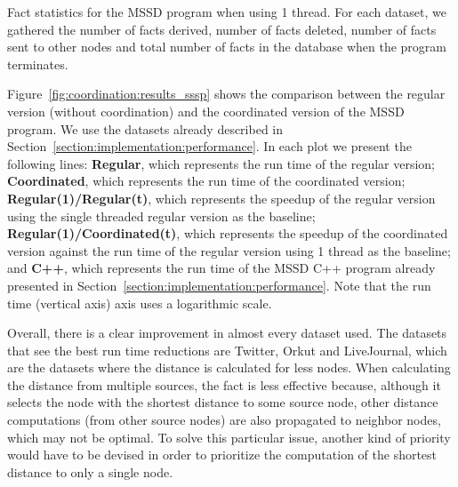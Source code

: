 \begin{table}[ht]
   \begin{center}
      
   \end{center}

   \caption{Fact statistics for the MSSD program when using 1 thread. For each
      dataset, we gathered the number of facts derived, number of facts deleted,
      number of facts sent to other nodes and total number of facts in the
      database when the program terminates.}

   \label{table:coordination:sssp_stats}
\end{table}

Figure~\ref{fig:coordination:results_sssp} shows the comparison between the
regular version (without coordination) and the coordinated version of the MSSD
program. We use the datasets already described in
Section~\ref{section:implementation:performance}.  In each plot we present the
following lines: \textbf{Regular}, which represents the run time of the regular
version; \textbf{Coordinated}, which represents the run time of the coordinated
version; \textbf{Regular(1)/Regular(t)}, which represents the speedup of the
regular version using the single threaded regular version as the baseline;
\textbf{Regular(1)/Coordinated(t)}, which represents the speedup of the
coordinated version against the run time of the regular version using 1 thread
as the baseline; and \textbf{C++}, which represents the run time of the MSSD C++
program already presented in Section~\ref{section:implementation:performance}.
Note that the run time (vertical axis) axis uses a logarithmic scale.

Overall, there is a clear improvement in almost every dataset used. The datasets
that see the best run time reductions are Twitter, Orkut and LiveJournal, which
are the datasets where the distance is calculated for less nodes. When
calculating the distance from multiple sources, the  fact is
less effective because, although it selects the node with the shortest distance
to some source node, other distance computations (from other source nodes) are
also propagated to neighbor nodes, which may not be optimal. To solve this
particular issue, another kind of priority would have to be devised in order to
prioritize the computation of the shortest distance to only a single node.

